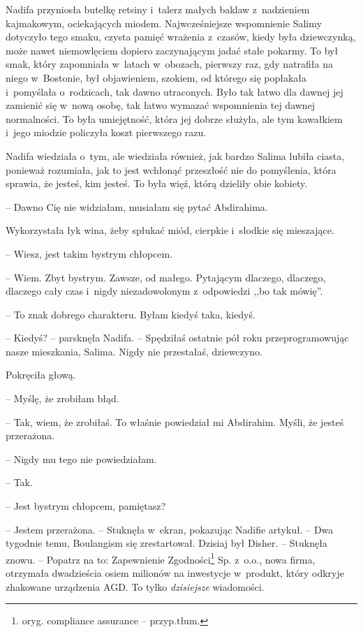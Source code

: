 \documentclass[oneside,polish,11pt,sfheadings]{mwbk}
\begin{document}
Nadifa przyniosła butelkę retsiny i~talerz małych baklaw z~nadzieniem
kajmakowym, ociekających miodem. Najwcześniejsze wspomnienie Salimy
dotyczyło tego smaku, czysta pamięć wrażenia z~czasów, kiedy była
dziewczynką, może nawet niemowlęciem dopiero zaczynającym jadać stałe
pokarmy. To był smak, który zapomniała w~latach w~obozach, pierwszy raz,
gdy natrafiła na niego w~Bostonie, był objawieniem, szokiem, od którego
się popłakała i~pomyślała o~rodzicach, tak dawno utraconych. Było tak
łatwo dla dawnej jej zamienić się w~nową osobę, tak łatwo wymazać
wspomnienia tej dawnej normalności. To była umiejętność, która jej
dobrze służyła, ale tym kawałkiem i~jego miodzie policzyła koszt
pierwszego razu.

Nadifa wiedziała o~tym, ale wiedziała również, jak bardzo Salima lubiła
ciasta, ponieważ rozumiała, jak to jest wchłonąć przeszłość nie do
pomyślenia, która sprawia, że jesteś, kim jesteś. To była więź, którą
dzieliły obie kobiety.

-- Dawno Cię nie widziałam, musiałam się pytać Abdirahima.

Wykorzystała łyk wina, żeby spłukać miód, cierpkie i~słodkie się
mieszające. 

-- Wiesz, jest takim bystrym chłopcem.

-- Wiem. Zbyt bystrym. Zawsze, od małego. Pytającym dlaczego, dlaczego,
dlaczego cały czas i~nigdy niezadowolonym z~odpowiedzi ,,bo tak mówię''.

-- To znak dobrego charakteru. Byłam kiedyś taka, kiedyś.

-- Kiedyś? -- parsknęła Nadifa. -- Spędziłaś ostatnie pół roku
przeprogramowując nasze mieszkania, Salima. Nigdy nie przestałaś,
dziewczyno.

Pokręciła głową. 

-- Myślę, że zrobiłam błąd.

-- Tak, wiem, że zrobiłaś. To właśnie powiedział mi Abdirahim. Myśli, że
jesteś przerażona.

-- Nigdy mu tego nie powiedziałam.

-- Tak. 

-- Jest bystrym chłopcem, pamiętasz?

-- Jestem przerażona. -- Stuknęła w~ekran, pokazując Nadifie artykuł. -- Dwa tygodnie temu, Boulangism się zrestartował. Dzisiaj był Disher. -- Stuknęła znowu. -- Popatrz na to: Zapewnienie Zgodności\footnote{ oryg.
compliance assurance -- przyp.tłum.} Sp. z~o.o., nowa firma, otrzymała dwadzieścia osiem
milionów na inwestycje w~produkt, który odkryje zhakowane urządzenia
AGD. To tylko \textit{dzisiejsze} wiadomości.
\end{document}
